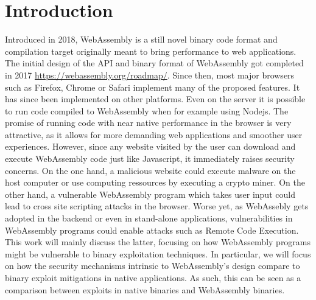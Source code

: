\documentclass[sigconf]{acmart}
\begin{document}



\maketitle

\section{Introduction}
Introduced in 2018, WebAssembly is a still novel binary code format and compilation target originally meant to bring performance to web applications. The initial design of the API and binary format of WebAssembly got completed in 2017 \url{https://webassembly.org/roadmap/}. Since then, most major browsers such as Firefox, Chrome or Safari implement many of the proposed features. It has since been implemented on other platforms. Even on the server it is possible to run code compiled to WebAssembly when for example using Nodejs. The promise of running code with near native performance in the browser is very attractive, as it allows for more demanding web applications and smoother user experiences. However, since any website visited by the user can download and execute WebAssembly code just like Javascript, it immediately raises security concerns. On the one hand, a malicious website could execute malware on the host computer or use computing ressources by executing a crypto miner. On the other hand, a vulnerable WebAssembly program which takes user input could lead to cross site scripting attacks in the browser. Worse yet, as WebAssebly gets adopted in the backend or even in stand-alone applications, vulnerabilities in WebAssembly programs could enable attacks such as Remote Code Execution. This work will mainly discuss the latter, focusing on how WebAssembly programs might be vulnerable to binary exploitation techniques. In particular, we will focus on how the security mechanisms intrinsic to WebAssembly's design compare to binary exploit mitigations in native applications. As such, this can be seen as a comparison between exploits in native binaries and WebAssembly binaries.
\end{document}
